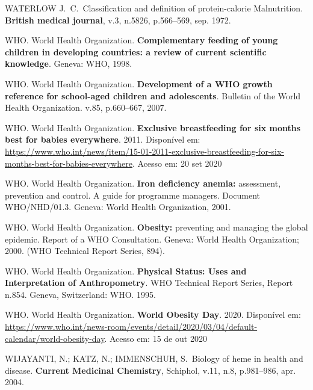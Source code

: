 \bigbreak

\noindent WATERLOW J.\ C.\ Classification and definition of protein-calorie Malnutrition. \textbf{British medical journal}, v.3, n.5826, p.566--569, sep. 1972.

\bigbreak

\noindent WHO. World Health Organization. \textbf{Complementary feeding of young children in developing countries: a review of current scientific knowledge}. Geneva: WHO, 1998.

\bigbreak

\noindent WHO. World Health Organization. \textbf{Development of a WHO growth reference for school-aged children and adolescents}. Bulletin of the World Health Organization. v.85, p.660--667, 2007. 

\bigbreak

\noindent WHO. World Health Organization. \textbf{Exclusive breastfeeding for six months best for babies everywhere}. 2011. Disponível em: \url{https://www.who.int/news/item/15-01-2011-exclusive-breastfeeding-for-six-months-best-for-babies-everywhere}. Acesso em: 20 set 2020

\bigbreak

\noindent WHO. World Health Organization. \textbf{Iron deficiency anemia:} assessment, prevention and control. A guide for programme managers. Document WHO/NHD/01.3. Geneva: World Health Organization, 2001.

\bigbreak

\noindent WHO. World Health Organization. \textbf{Obesity:} preventing and managing the global epidemic. Report of a WHO Consultation. Geneva: World Health Organization; 2000. (WHO Technical Report Series, 894).

\bigbreak

\noindent WHO. World Health Organization. \textbf{Physical Status: Uses and Interpretation of Anthropometry}. WHO Technical Report Series, Report n.854. Geneva, Switzerland: WHO. 1995.

\noindent WHO. World Health Organization. \textbf{World Obesity Day}. 2020. Disponível em: \url{https://www.who.int/news-room/events/detail/2020/03/04/default-calendar/world-obesity-day}. Acesso em: 15 de out 2020

\bigbreak

\noindent WIJAYANTI, N.; KATZ, N.; IMMENSCHUH, S.\ Biology of heme in health and disease. \textbf{Current Medicinal Chemistry}, Schiphol, v.11, n.8, p.981--986, apr. 2004.

\bigbreak

